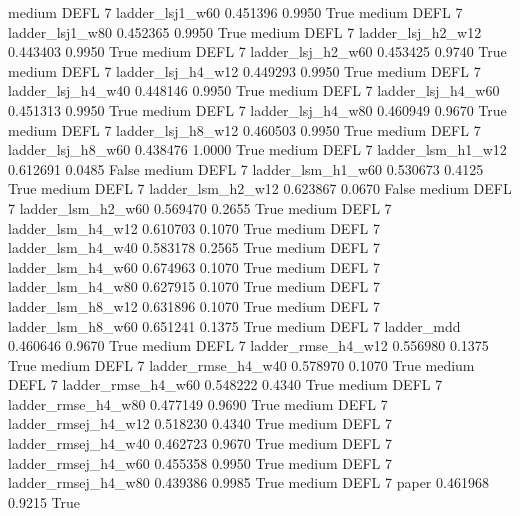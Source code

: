     medium     DEFL                 7     ladder_lsj1_w60   0.451396      0.9950    True
    medium     DEFL                 7     ladder_lsj1_w80   0.452365      0.9950    True
    medium     DEFL                 7   ladder_lsj_h2_w12   0.443403      0.9950    True
    medium     DEFL                 7   ladder_lsj_h2_w60   0.453425      0.9740    True
    medium     DEFL                 7   ladder_lsj_h4_w12   0.449293      0.9950    True
    medium     DEFL                 7   ladder_lsj_h4_w40   0.448146      0.9950    True
    medium     DEFL                 7   ladder_lsj_h4_w60   0.451313      0.9950    True
    medium     DEFL                 7   ladder_lsj_h4_w80   0.460949      0.9670    True
    medium     DEFL                 7   ladder_lsj_h8_w12   0.460503      0.9950    True
    medium     DEFL                 7   ladder_lsj_h8_w60   0.438476      1.0000    True
    medium     DEFL                 7   ladder_lsm_h1_w12   0.612691      0.0485   False
    medium     DEFL                 7   ladder_lsm_h1_w60   0.530673      0.4125    True
    medium     DEFL                 7   ladder_lsm_h2_w12   0.623867      0.0670   False
    medium     DEFL                 7   ladder_lsm_h2_w60   0.569470      0.2655    True
    medium     DEFL                 7   ladder_lsm_h4_w12   0.610703      0.1070    True
    medium     DEFL                 7   ladder_lsm_h4_w40   0.583178      0.2565    True
    medium     DEFL                 7   ladder_lsm_h4_w60   0.674963      0.1070    True
    medium     DEFL                 7   ladder_lsm_h4_w80   0.627915      0.1070    True
    medium     DEFL                 7   ladder_lsm_h8_w12   0.631896      0.1070    True
    medium     DEFL                 7   ladder_lsm_h8_w60   0.651241      0.1375    True
    medium     DEFL                 7          ladder_mdd   0.460646      0.9670    True
    medium     DEFL                 7  ladder_rmse_h4_w12   0.556980      0.1375    True
    medium     DEFL                 7  ladder_rmse_h4_w40   0.578970      0.1070    True
    medium     DEFL                 7  ladder_rmse_h4_w60   0.548222      0.4340    True
    medium     DEFL                 7  ladder_rmse_h4_w80   0.477149      0.9690    True
    medium     DEFL                 7 ladder_rmsej_h4_w12   0.518230      0.4340    True
    medium     DEFL                 7 ladder_rmsej_h4_w40   0.462723      0.9670    True
    medium     DEFL                 7 ladder_rmsej_h4_w60   0.455358      0.9950    True
    medium     DEFL                 7 ladder_rmsej_h4_w80   0.439386      0.9985    True
    medium     DEFL                 7               paper   0.461968      0.9215    True
